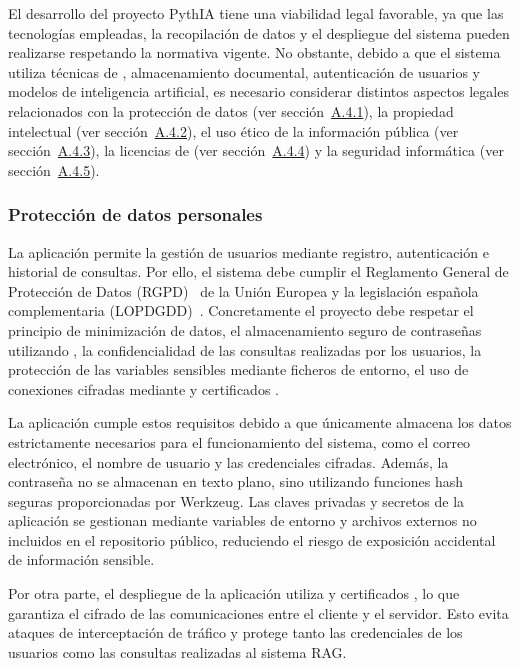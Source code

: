 El desarrollo del proyecto PythIA tiene una viabilidad legal favorable, ya que las tecnologías empleadas, la recopilación de datos y el despliegue del sistema pueden realizarse respetando la normativa vigente. No obstante, debido a que el sistema utiliza técnicas de , almacenamiento documental, autenticación de usuarios y modelos de inteligencia artificial, es necesario considerar distintos aspectos legales relacionados con la protección de datos (ver sección~\hyperref[subsec:proctdatos]{A.4.1}), la propiedad intelectual (ver sección~\hyperref[subsec:propiedad]{A.4.2}), el uso ético de la información pública (ver sección~\hyperref[subsec:webScraping]{A.4.3}), la licencias de  (ver sección~\hyperref[subsec:IA]{A.4.4}) y la seguridad informática (ver sección~\hyperref[subsec:seg]{A.4.5}).

\subsubsection{Protección de datos personales}\label{subsec:proctdatos}

La aplicación permite la gestión de usuarios mediante registro, autenticación e historial de consultas. Por ello, el sistema debe cumplir el Reglamento General de Protección de Datos (RGPD)~\cite{legal:procdatos} de la Unión Europea y la legislación española complementaria (LOPDGDD)~\cite{legal:procdatoses}. Concretamente el proyecto debe respetar el principio de minimización de datos, el almacenamiento seguro de contraseñas utilizando , la confidencialidad de las consultas realizadas por los usuarios, la protección de las variables sensibles mediante ficheros de entorno, el uso de conexiones cifradas mediante  y certificados .

La aplicación cumple estos requisitos debido a que únicamente almacena los datos estrictamente necesarios para el funcionamiento del sistema, como el correo electrónico, el nombre de usuario y las credenciales cifradas. Además, la contraseña no se almacenan en texto plano, sino utilizando funciones hash seguras proporcionadas por Werkzeug. Las claves privadas y secretos de la aplicación se gestionan mediante variables de entorno y archivos externos no incluidos en el repositorio público, reduciendo el riesgo de exposición accidental de información sensible.

Por otra parte, el despliegue de la aplicación utiliza  y certificados , lo que garantiza el cifrado de las comunicaciones entre el cliente y el servidor. Esto evita ataques de interceptación de tráfico y protege tanto las credenciales de los usuarios como las consultas realizadas al sistema RAG.
 
